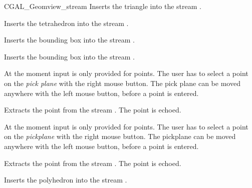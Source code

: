 \begin{ccClass}{CGAL_Geomview_stream}
{Inserts the triangle  into the stream \ccVar.}


{Inserts the tetrahedron  into the stream \ccVar.}


{Inserts the bounding box  into the stream \ccVar.}

{Inserts the bounding box  into the stream \ccVar.}



At the moment input is only provided for points. The user has to select
a point on the {\it pick plane} with the right mouse button. The pick plane
can be moved anywhere with the left mouse button, before a point is entered.

{Extracts the point  from the stream \ccVar. The point is
 echoed.}



At the moment input is only provided for points. The user has to select
a point on the {\it pickplane} with the right mouse button. The pickplane
can be moved anywhere with the left mouse button, before a point is entered.

{Extracts the point  from the stream \ccVar. The point is
 echoed.}



{Inserts the polyhedron  into the stream \ccVar.}


\end{ccClass}
